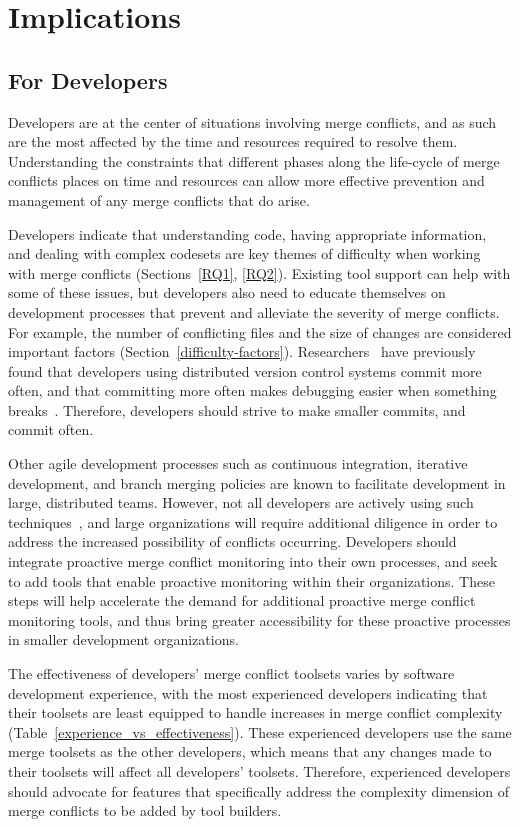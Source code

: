 \section{Implications}\label{implications}

\subsection{For Developers}
Developers are at the center of situations involving merge conflicts, and as such are the most affected by the time and resources required to resolve them.
Understanding the constraints that different phases along the life-cycle of merge conflicts places on time and resources can allow more effective prevention and management of any merge conflicts that do arise.

Developers indicate that understanding code, having appropriate information, and dealing with complex codesets are key themes of difficulty when working with merge conflicts (Sections~\ref{RQ1}, \ref{RQ2}).
Existing tool support can help with some of these issues, but developers also need to educate themselves on development processes that prevent and alleviate the severity of merge conflicts. 
For example, the number of conflicting files and the size of changes are considered important factors (Section~\ref{difficulty-factors}).
Researchers~\cite{brindescu2014versioncontrol} have previously found that developers using distributed version control systems commit more often, and that committing more often makes debugging easier when something breaks~\cite{meyer2014continuous}.
Therefore, developers should strive to make smaller commits, and commit often.

Other agile development processes such as continuous integration, iterative development, and branch merging policies are known to facilitate development in large, distributed teams. 
However, not all developers are actively using such techniques~\cite{phillips2011branching}, and large organizations will require additional diligence in order to address the increased possibility of conflicts occurring.
Developers should integrate proactive merge conflict monitoring into their own processes, and seek to add tools that enable proactive monitoring within their organizations.
These steps will help accelerate the demand for additional proactive merge conflict monitoring tools, and thus bring greater accessibility for these proactive processes in smaller development organizations.

The effectiveness of developers' merge conflict toolsets varies by software development experience, with the most experienced developers indicating that their toolsets are least equipped to handle increases in merge conflict complexity (Table~\ref{experience_vs_effectiveness}).
These experienced developers use the same merge toolsets as the other developers, which means that any changes made to their toolsets will affect all developers' toolsets.
Therefore, experienced developers should advocate for features that specifically address the complexity dimension of merge conflicts to be added by tool builders.

